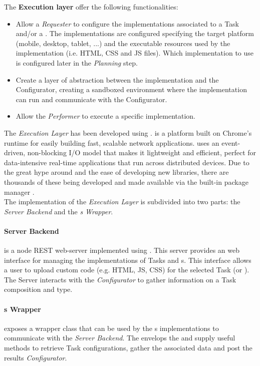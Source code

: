 The \textbf{Execution layer} offer the following functionalities:
\begin{itemize}
    \item Allow a \emph{Requester} to configure the implementations associated to
    a Task and/or a \utask{}. The implementations are configured specifying the
    target platform (mobile, desktop, tablet, ...) and the executable resources
    used by the implementation (i.e. HTML, CSS and JS files). Which implementation
    to use is configured later in the \emph{Planning} step.

    \item Create a layer of abstraction between the implementation and the
    Configurator, creating a sandboxed environment where the implementation can
    run and communicate with the Configurator.

    \item Allow the \emph{Performer} to execute a specific \utask{} implementation.
\end{itemize}

\noindent The \emph{Execution Layer} has been developed using .
 is a platform built on Chrome's \js{} runtime for easily building fast,
scalable network applications.  uses an event-driven, non-blocking I/O model
that makes it lightweight and efficient, perfect for data-intensive real-time
applications that run across distributed devices. Due to the great hype
around  and the ease of developing new libraries, there are
thousands of these being developed and made available via the built-in
package manager .\\

The implementation of the \emph{Execution Layer} is subdivided into two parts:
the \emph{Server Backend} and the \emph{\utask{}s Wrapper}.

\paragraph{Server Backend} is a node REST web-server implemented using
. This server provides an web interface for managing the
implementations of Tasks and \utask{}s. This interface allows a user to upload
custom code (e.g. HTML, JS, CSS) for the selected Task (or \utask{}).
The Server interacts with the \emph{Configurator} to gather information on
a Task composition and type.

\paragraph{\utask{}s Wrapper} exposes a wrapper class that can be used by the
\utask{}s implementations to communicate with the \emph{Server Backend}. The
envelops the \utask{} and supply useful methods to retrieve Task configurations,
gather the associated data and post the results \emph{Configurator}.\\






